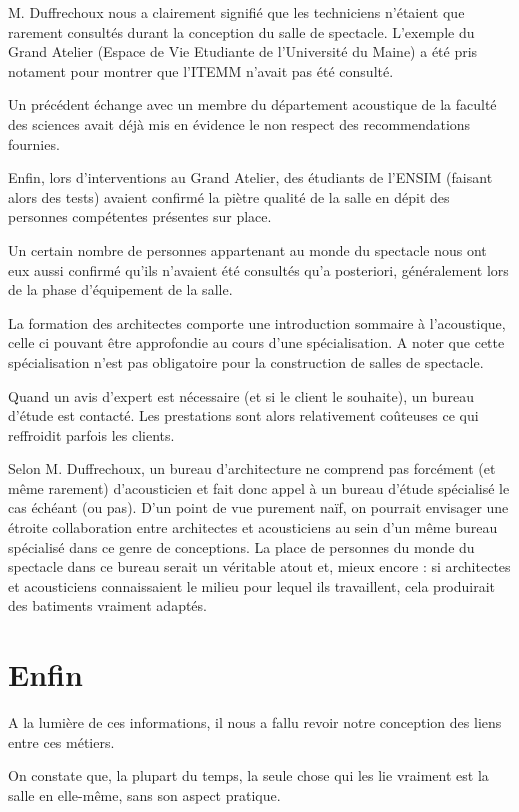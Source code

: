 \documentclass[a4paper, 11pt]{report}
\begin{document}
M. {\sc Duffrechoux} nous a clairement signifié que les techniciens n'étaient que rarement consultés durant la conception du salle de spectacle.
L'exemple du Grand Atelier (Espace de Vie Etudiante de l'Université du Maine) a été pris notament pour montrer que  l'ITEMM n'avait pas été consulté.

Un précédent échange avec un membre du département acoustique de la faculté des sciences avait déjà mis en évidence le non respect des recommendations fournies.

Enfin, lors d'interventions au Grand Atelier, des étudiants de l'ENSIM (faisant alors des tests) avaient confirmé la piètre qualité de la salle en dépit des personnes compétentes présentes sur place.

\medskip

Un certain nombre de personnes appartenant au monde du spectacle nous ont eux aussi confirmé qu'ils n'avaient été consultés qu'a posteriori, généralement lors de la phase d'équipement de la salle.

La formation des architectes comporte une introduction sommaire à l'acoustique, celle ci pouvant être approfondie au cours d'une spécialisation.
A noter que cette spécialisation n'est pas obligatoire pour la construction de salles de spectacle.

Quand un avis d'expert est nécessaire (et si le client le souhaite), un bureau d'étude est contacté.
Les prestations sont alors relativement coûteuses ce qui reffroidit parfois les clients.


Selon M. {\sc Duffrechoux}, un bureau d'architecture ne comprend pas forcément (et même rarement) d'acousticien et fait donc appel à un bureau d'étude spécialisé le cas échéant (ou pas).
D'un point de vue purement naïf, on pourrait envisager une étroite collaboration entre architectes et acousticiens au sein d'un même bureau spécialisé dans ce genre de conceptions.
La place de personnes du monde du spectacle dans ce bureau serait un véritable atout et, mieux encore : si architectes et acousticiens connaissaient le milieu pour lequel ils travaillent, cela produirait des batiments vraiment adaptés.

\section{Enfin}

A la lumière de ces informations, il nous a fallu revoir notre conception des liens entre ces métiers.

On constate que, la plupart du temps, la seule chose qui les lie vraiment est la salle en elle-même, sans son aspect pratique.
\end{document}

